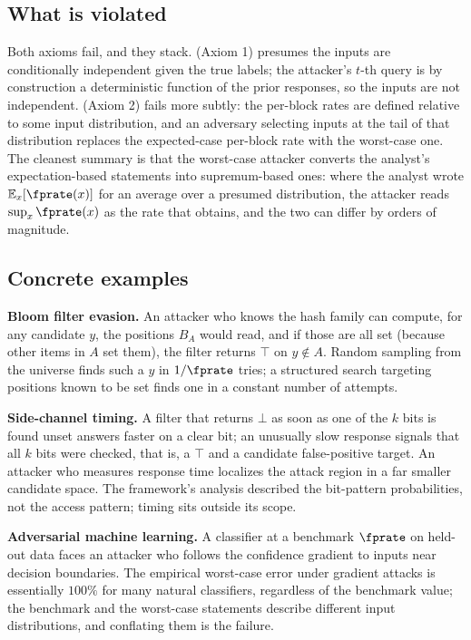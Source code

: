 \subsection*{What is violated}

Both axioms fail, and they stack.  (Axiom 1)
presumes the inputs are conditionally independent given the true labels;
the attacker's $t$-th query is by construction a deterministic function of
the prior responses, so the inputs are not independent. 
(Axiom 2) fails more subtly: the per-block rates are defined relative to
some input distribution, and an adversary selecting inputs at the tail of
that distribution replaces the expected-case per-block rate with the
worst-case one. The cleanest summary is that the worst-case attacker
converts the analyst's expectation-based statements into supremum-based
ones: where the analyst wrote $\mathbb{E}_x[\fprate(x)]$ for an average over a
presumed distribution, the attacker reads $\sup_x \fprate(x)$ as the rate
that obtains, and the two can differ by orders of magnitude.

\subsection*{Concrete examples}

\textbf{Bloom filter evasion.} An attacker who knows the hash family can
compute, for any candidate $y$, the positions $B_A$ would read, and if
those are all set (because other items in $A$ set them), the filter
returns $\top$ on $y \notin A$. Random sampling from the universe finds
such a $y$ in $1/\fprate$ tries; a structured search targeting positions
known to be set finds one in a constant number of attempts.

\textbf{Side-channel timing.} A filter that returns $\bot$ as soon as one
of the $k$ bits is found unset answers faster on a clear bit; an unusually
slow response signals that all $k$ bits were checked, that is, a $\top$
and a candidate false-positive target. An attacker who measures response
time localizes the attack region in a far smaller candidate space. The
framework's analysis described the bit-pattern probabilities, not the
access pattern; timing sits outside its scope.

\textbf{Adversarial machine learning.} A classifier at a benchmark
$\fprate$ on held-out data faces an attacker who follows the confidence
gradient to inputs near decision boundaries. The empirical worst-case
error under gradient attacks is essentially $100\%$ for many natural
classifiers, regardless of the benchmark value; the benchmark and the
worst-case statements describe different input distributions, and
conflating them is the failure.

